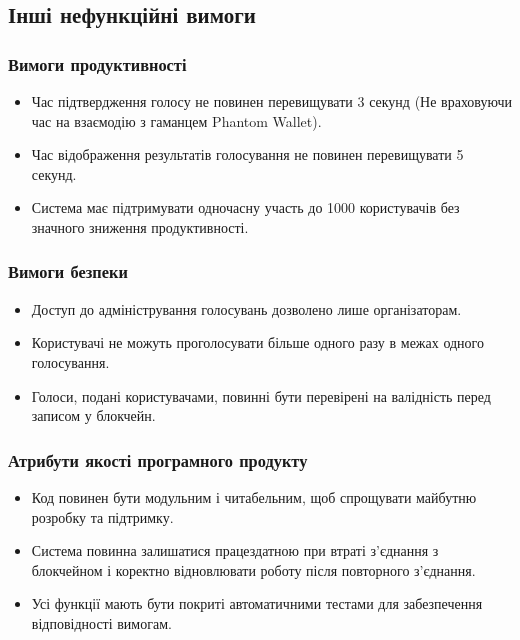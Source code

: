 \documentclass[14pt]{extreport}
\begin{document}
  \subsection{Інші нефункційні вимоги}
  \subsubsection{Вимоги продуктивності}
  \begin{itemize}
    \item Час підтвердження голосу не повинен перевищувати 3 секунд (Не враховуючи час на взаємодію з гаманцем Phantom Wallet).
    \item Час відображення результатів голосування не повинен перевищувати 5 секунд.  
    \item Система має підтримувати одночасну участь до 1000 користувачів без значного зниження продуктивності.  
  \end{itemize}

  \subsubsection{Вимоги безпеки}
  \begin{itemize}
    \item Доступ до адміністрування голосувань дозволено лише організаторам.
    \item Користувачі не можуть проголосувати більше одного разу в межах одного голосування.
    \item Голоси, подані користувачами, повинні бути перевірені на валідність перед записом у блокчейн.
  \end{itemize}
  
  \subsubsection{Атрибути якості програмного продукту}
  \begin{itemize}  
    \item Код повинен бути модульним і читабельним, щоб спрощувати майбутню розробку та підтримку.  
    \item Система повинна залишатися працездатною при втраті з'єднання з блокчейном і коректно відновлювати роботу після повторного з'єднання.
    \item Усі функції мають бути покриті автоматичними тестами для забезпечення відповідності вимогам.  
  \end{itemize}

 
\end{document}
